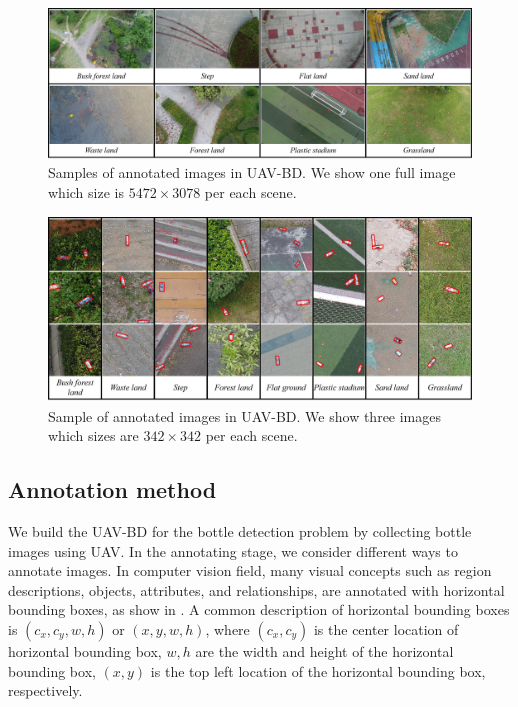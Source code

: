 \begin{figure}
	\includegraphics[width=\linewidth]{images/UAV-BD1.png}
	\caption{Samples of annotated images in UAV-BD. We show one full image which size is $ 5472\times 3078 $ per each scene.}
	\label{fig:dataset-original-image}
\end{figure}



\begin{figure}
	\includegraphics[width=\linewidth]{images/UAV-BD2.png}
	\caption{Sample of annotated images in UAV-BD. We show three images which sizes are $ 342\times 342 $ per each scene.}
	\label{fig:dataset-cut-image}
\end{figure}



\subsection{Annotation method}
\label{ssec:annotation_method}




We build the UAV-BD for the bottle detection problem by collecting bottle images using UAV. In the annotating stage, we consider different ways to annotate images. In computer vision field, many visual concepts such as region descriptions, objects, attributes, and relationships, are annotated with horizontal bounding boxes, as show in \cite{DOTA, boundingbox}. A common description of horizontal bounding boxes is $(c_x, c_y, w, h)$ or $ (x, y, w, h) $, where $(c_x, c_y)$ is the center location of horizontal bounding box, $w, h$ are the width and height of the horizontal bounding box, $ (x, y) $ is the top left location of the horizontal bounding box, respectively\cite{DOTA}. 

